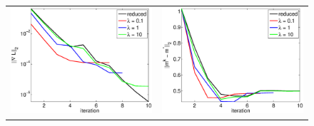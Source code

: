 \documentclass{iopart}
\begin{document}
\begin{figure}
\centering
\begin{tabular}{cc}
\includegraphics[scale=.3]{./figs/2D_exp1_b}&
\includegraphics[scale=.3]{./figs/2D_exp1_c}\\
\end{tabular}
\centering
\begin{tabular}{cccc}

\end{tabular}
\end{figure}
\end{document}
